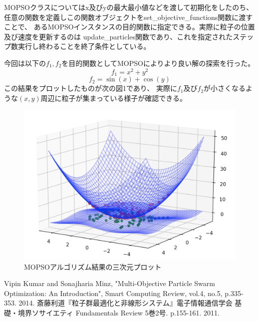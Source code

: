 \documentclass[uplatex]{jsarticle}
\begin{document}
MOPSOクラスについてはx及びyの最大最小値などを渡して初期化をしたのち、
任意の関数を定義しこの関数オブジェクトをset\_objective\_functions関数に渡すことで、
あるMOPSOインスタンスの目的関数に指定できる。実際に粒子の位置及び速度を更新するのは
update\_particles関数であり、これを指定されたステップ数実行し終わることを終了条件としている。

今回は以下の$f_1, f_2$を目的関数としてMOPSOによりより良い解の探索を行った。
$$f_1 = x^2 + y^2$$
$$f_2 = \sin{(x)} + \cos{(y)}$$
この結果をプロットしたものが次の図1であり、
実際に$f_1及びf_2$が小さくなるような$(x,y)$周辺に粒子が集まっている様子が確認できる。
\begin{figure}
  \begin{center}
    \includegraphics[width=15cm]{mopso_result.png}
    \caption{MOPSOアルゴリズム結果の三次元プロット}
  \end{center}
\end{figure}

\begin{thebibliography}{9}
 Vipin Kumar and Sonajharia Minz, "Multi-Objective Particle Swarm Optimization: An Introduction", Smart Computing Review, vol.4,
no.5, p.335-353. 2014.
斎藤利道『粒子群最適化と非線形システム』電子情報通信学会 基礎・境界ソサイエティ Fundamentals Review 5巻2号. p.155-161. 2011.
\end{thebibliography}
\end{document}
